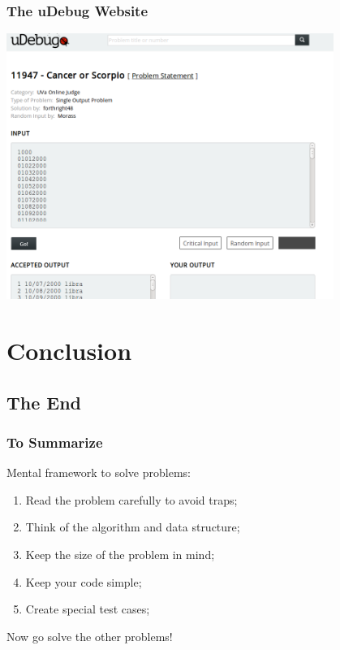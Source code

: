 \documentclass{beamer}
\begin{document}
\begin{frame}
  \frametitle{The uDebug Website}

  \begin{center}
    \includegraphics[width=0.8\textwidth]{../img/udebug_big}
  \end{center}
\end{frame}



\section{Conclusion}
\subsection{The End}
\begin{frame}
  \frametitle{To Summarize}
  Mental framework to solve problems:
  \begin{enumerate}
  \item Read the problem carefully to avoid traps;
  \item Think of the algorithm and data structure;
  \item Keep the size of the problem in mind;
  \item Keep your code simple;
  \item Create special test cases;
  \end{enumerate}

  \vfill

  \begin{block}{}
    Now go solve the other problems!
  \end{block}
\end{frame}
\end{document}
